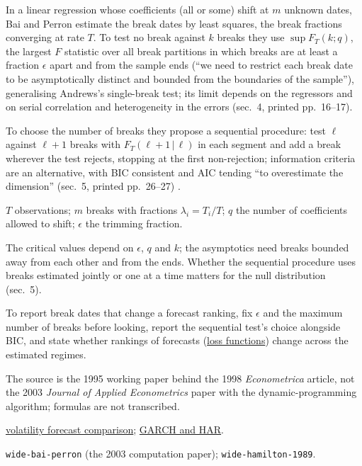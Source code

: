 \begin{qfmethod}\label{meth:structural-break-tests}
 In a linear regression whose coefficients (all or some) shift at $m$ unknown dates, Bai and Perron estimate the break dates by least squares, the break fractions converging at rate $T$. To test no break against $k$ breaks they use $\sup F_T(k;q)$, the largest $F$ statistic over all break partitions in which breaks are at least a fraction $\epsilon$ apart and from the sample ends (``we need to restrict each break date to be asymptotically distinct and bounded from the boundaries of the sample''), generalising Andrews's single-break test; its limit depends on the regressors and on serial correlation and heterogeneity in the errors (sec.~4, printed pp.~16--17).

To choose the number of breaks they propose a sequential procedure: test $\ell$ against $\ell+1$ breaks with $F_T(\ell+1\,|\,\ell)$ in each segment and add a break wherever the test rejects, stopping at the first non-rejection; information criteria are an alternative, with BIC consistent and AIC tending ``to overestimate the dimension'' (sec.~5, printed pp.~26--27) \citep[MIT Department of Economics Working Paper 95-17, September 1995, abstract and secs.~4--5]{wide-bai-perron}.

 $T$ observations; $m$ breaks with fractions $\lambda_i=T_i/T$; $q$ the number of coefficients allowed to shift; $\epsilon$ the trimming fraction.

 The critical values depend on $\epsilon$, $q$ and $k$; the asymptotics need breaks bounded away from each other and from the ends. Whether the sequential procedure uses breaks estimated jointly or one at a time matters for the null distribution (sec.~5).

 To report break dates that change a forecast ranking, fix $\epsilon$ and the maximum number of breaks before looking, report the sequential test's choice alongside BIC, and state whether rankings of forecasts (\hyperref[meth:volatility-forecast-loss]{loss functions}) change across the estimated regimes.

 The source is the 1995 working paper behind the 1998 \emph{Econometrica} article, not the 2003 \emph{Journal of Applied Econometrics} paper with the dynamic-programming algorithm; formulas are not transcribed.

 \hyperref[meth:volatility-forecast-loss]{volatility forecast comparison}; \hyperref[mod:garch-volatility-forecast]{GARCH and HAR}.

 \nolinkurl{wide-bai-perron} (the 2003 computation paper); \nolinkurl{wide-hamilton-1989}.

\end{qfmethod}
